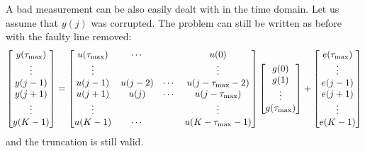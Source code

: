 A bad measurement can be also easily dealt with in the time domain. Let us assume that $y(j)$ was corrupted. The problem can still be written as before with the faulty line removed:
\begin{equation*}
  \begin{bmatrix}
y(\tau_\text{max}) \\ \vdots \\ y(j-1) \\ y(j+1) \\ \vdots \\ y(K-1)
  \end{bmatrix} =
  \begin{bmatrix}
    u(\tau_\text{max}) & \cdots & & u(0) \\
    \vdots & & & \vdots \\
    u(j-1) & u(j-2) & \cdots & u(j-\tau_\text{max}-2) \\
    u(j+1) & u(j) & \cdots & u(j-\tau_\text{max}) \\
    \vdots & & & \vdots \\
    u(K-1) & \cdots & & u(K-\tau_\text{max}-1)
  \end{bmatrix}
  \begin{bmatrix}
    g(0) \\ g(1) \\ \vdots \\ g(\tau_\text{max})
  \end{bmatrix} +
  \begin{bmatrix}
e(\tau_\text{max}) \\ \vdots \\ e(j-1) \\ e(j+1) \\ \vdots \\ e(K-1)
  \end{bmatrix}
\end{equation*}
and the truncation is still valid.

